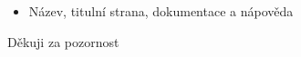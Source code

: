 \documentclass[9pt]{beamer}
\begin{document}
\begin{frame}
\begin{columns}
\begin{figure}
            \end{figure}
        \end{columns}
        \begin{itemize}
            \item<1-> Název, titulní strana, dokumentace a nápověda
        \end{itemize}
    \end{frame}
    \begin{frame}
        \begin{block}{}
            \centering
            {\Huge Děkuji za pozornost}
        \end{block}
    \end{frame}
\end{document}
